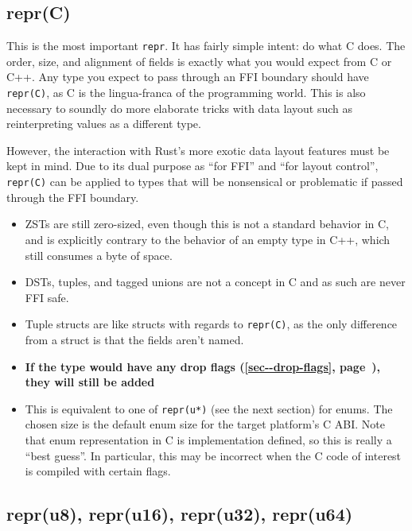 \documentclass[a4paper,]{book}
\renewcommand*{\hyperlink}[2]{%
 #2 (\autoref{#1}, page~\pageref{#1})}
\begin{document}
\subsection{repr(C)}\label{reprc}

This is the most important \texttt{repr}. It has fairly simple intent:
do what C does. The order, size, and alignment of fields is exactly what
you would expect from C or C++. Any type you expect to pass through an
FFI boundary should have \texttt{repr(C)}, as C is the lingua-franca of
the programming world. This is also necessary to soundly do more
elaborate tricks with data layout such as reinterpreting values as a
different type.

However, the interaction with Rust's more exotic data layout features
must be kept in mind. Due to its dual purpose as ``for FFI'' and ``for
layout control'', \texttt{repr(C)} can be applied to types that will be
nonsensical or problematic if passed through the FFI boundary.

\begin{itemize}
\item
  ZSTs are still zero-sized, even though this is not a standard behavior
  in C, and is explicitly contrary to the behavior of an empty type in
  C++, which still consumes a byte of space.
\item
  DSTs, tuples, and tagged unions are not a concept in C and as such are
  never FFI safe.
\item
  Tuple structs are like structs with regards to \texttt{repr(C)}, as
  the only difference from a struct is that the fields aren't named.
\item
  \textbf{If the type would have any
  \protect\hyperlink{sec--drop-flags}{drop flags}, they will still be
  added}
\item
  This is equivalent to one of \texttt{repr(u*)} (see the next section)
  for enums. The chosen size is the default enum size for the target
  platform's C ABI. Note that enum representation in C is implementation
  defined, so this is really a ``best guess''. In particular, this may
  be incorrect when the C code of interest is compiled with certain
  flags.
\end{itemize}

\subsection{repr(u8), repr(u16), repr(u32),
repr(u64)}\label{repru8-repru16-repru32-repru64}
\end{document}
